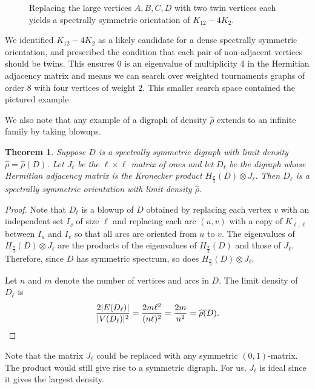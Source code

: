 \documentclass[11pt]{article}
\theoremstyle{plain}
\newtheorem{theorem}{Theorem}[section]
\newcommand{\ssym}[0]{spectrally symmetric }
\newcommand{\Hs}[0]{H_{\frac{\pi}{3}}}
\begin{document}
\begin{figure}
\begin{tikzpicture}
\end{tikzpicture}

    \caption{Replacing the large vertices $A,B,C,D$ with two twin vertices each yields a spectrally symmetric orientation of $K_{12}-4K_{2}$.}
    \label{fig:K12-4K2}
\end{figure}

We identified $K_{12}-4K_2$ as a likely candidate for a dense spectrally symmetric orientation, and prescribed the condition that each pair of non-adjacent vertices should be twins. This ensures $0$ is an eigenvalue of multiplicity 4 in the Hermitian adjacency matrix and means we can search over weighted tournaments graphs of order $8$ with four vertices of weight 2. This smaller search space contained the pictured example.



We also note that any example of a digraph of density $\hat{\rho}$ extends to an infinite family by taking blowups. 

\begin{theorem}\label{Thm:Density_Lemma}
    Suppose $D$ is a \ssym digraph with limit density $\widehat{\rho}=\widehat{\rho}(D)$. Let $J_\ell$ be the $\ell\times \ell$ matrix of ones and let $D_\ell$ be the digraph whose Hermitian adjacency matrix is the Kronecker product $\Hs(D) \otimes J_\ell$. Then $D_\ell$ is a \ssym orientation with limit density $\widehat{\rho}$.
\end{theorem}

\begin{proof}
     Note that $D_\ell$ is a blowup of $D$ obtained by replacing each vertex $v$ with an independent set $I_v$ of size $\ell$ and replacing each arc $(u,v)$ with a copy of $K_{\ell,\ell}$ between $I_u$ and $I_v$ so that all arcs are oriented from $u$ to $v$. The eigenvalues of $\Hs(D)\otimes J_\ell$ are the products of the eigenvalues of $\Hs(D)$ and those of $J_\ell$. Therefore, since $D$ has symmetric spectrum, so does $\Hs(D)\otimes J_\ell$.

     Let $n$ and $m$ denote the number of vertices and arcs in $D$. The limit density of $D_\ell$ is 
    \[\frac{2|E(D_\ell)|}{|V(D_\ell)|^2}=\frac{2m\ell^2}{(n\ell)^2}=\frac{2m}{n^2}=\widehat\rho(D).\qedhere\]
\end{proof}

Note that the matrix $J_\ell$ could be replaced with any symmetric $(0,1)$-matrix. The product would still give rise to a symmetric digraph. For us, $J_\ell$ is ideal since it gives the largest density.
\end{document}
